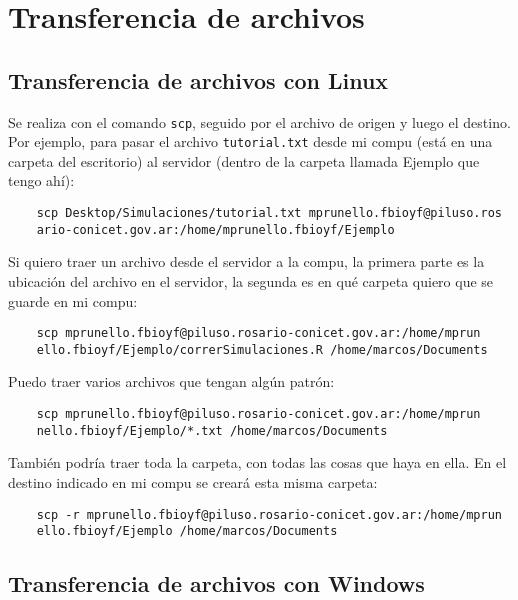 \documentclass[paper=a4, fontsize=11pt]{scrartcl} %
\numberwithin{equation}{section} %
\numberwithin{figure}{section} %
\numberwithin{table}{section} %
\begin{document}
\section{Transferencia de archivos}

\subsection{Transferencia de archivos con Linux}

Se realiza con el comando \texttt{scp}, seguido por el archivo de origen y luego el destino. Por ejemplo, para pasar el archivo \texttt{tutorial.txt} desde mi compu (está en una carpeta del escritorio) al servidor (dentro de la carpeta llamada Ejemplo que tengo ahí):

\begin{verbatim}
	scp Desktop/Simulaciones/tutorial.txt mprunello.fbioyf@piluso.ros
	ario-conicet.gov.ar:/home/mprunello.fbioyf/Ejemplo
\end{verbatim}

Si quiero traer un archivo desde el servidor a la compu, la primera parte es la ubicación del archivo en el servidor, la segunda es en qué carpeta quiero que se guarde en mi compu:

\begin{verbatim}
	scp mprunello.fbioyf@piluso.rosario-conicet.gov.ar:/home/mprun
	ello.fbioyf/Ejemplo/correrSimulaciones.R /home/marcos/Documents
\end{verbatim}

Puedo traer varios archivos que tengan algún patrón:

\begin{verbatim}
	scp mprunello.fbioyf@piluso.rosario-conicet.gov.ar:/home/mprun
	nello.fbioyf/Ejemplo/*.txt /home/marcos/Documents
\end{verbatim}

También podría traer toda la carpeta, con todas las cosas que haya en ella. En el destino indicado en mi compu se creará esta misma carpeta:

\begin{verbatim}
	scp -r mprunello.fbioyf@piluso.rosario-conicet.gov.ar:/home/mprun
	ello.fbioyf/Ejemplo /home/marcos/Documents
\end{verbatim}

\subsection{Transferencia de archivos con Windows}
\end{document}
